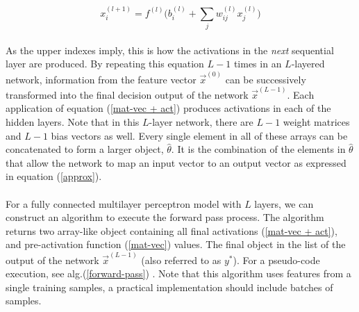 \documentclass[12pt,letterpaper]{article}
\begin{document}
\begin{equation}
\label{single element + act}
x^{(l+1)}_i = f^{(l)} \Big( b^{(l)}_i + \sum_{j} w^{(l)}_{ij} x^{(l)}_j \Big)
\end{equation}

\paragraph*{}As the upper indexes imply, this is how the activations in the \textit{next} sequential layer are produced. By repeating this equation $L-1$ times in an $L$-layered network, information from the feature vector $\vec{x}^{(0)}$ can be successively transformed into the final decision output of the network $\vec{x}^{(L-1)}$. Each application of equation (\ref{mat-vec + act}) produces activations in each of the hidden layers. Note that in this $L$-layer network, there are $L-1$ weight matrices and $L-1$ bias vectors as well. Every single element in all of these arrays can be concatenated to form a larger object, $\hat{\theta}$. It is the combination of the elements in $\hat{\theta}$ that allow the network to map an input vector to an output vector as expressed in equation (\ref{approx}).

\paragraph*{}For a fully connected multilayer perceptron model with $L$ layers, we can construct an algorithm to execute the forward pass process. The algorithm returns two array-like object containing all final activations (\ref{mat-vec + act}), and pre-activation function (\ref{mat-vec}) values. The final object in the list of the output of the network $\vec{x}^{(L-1)}$ (also referred to as $y^*$). For a pseudo-code execution, see alg.(\ref{forward-pass}) \cite{Goodfellow}. Note that this algorithm uses features from a single training samples, a practical implementation should include batches of samples.
\end{document}
